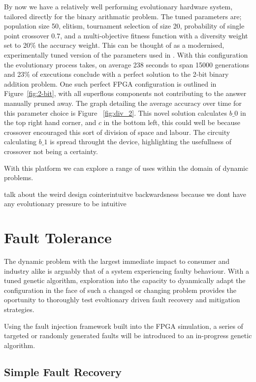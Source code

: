 By now we have a relatively well performing evolutionary hardware system,
tailored directly for the binary arithmatic problem. The tuned parameters
are; population size 50, elitism, tournament selection of size 20,
probability of single point crossover 0.7, and a multi-objective fitness function
with a diversity weight set to 20\% the accuracy weight.
This can be thought of as a modernised, experimentally tuned version of the
parameters used in \cite{10.1007/3-540-63173-9_61}.
With this configuration
the evolutionary process takes, on average 238 seconds to span 15000 generations
and 23\% of executions conclude with a perfect solution to the 2-bit binary addition
problem. One such perfect FPGA configuration is outlined in Figure~\ref{fig:2-bit},
with all superflous components not contributing to the answer manually pruned away.
The graph detailing the average accuracy over time for this parameter choice is Figure
~\ref{fig:div_2}.
This novel solution calculates $b\_0$ in the top right hand corner, and $c$ in the
bottom left, this could well be because crossover encouraged this sort of division
of space and labour. The circuity calculating $b\_1$ is spread throught the device,
highlighting the usefullness of crossover not being a certainty.

With this platform we can explore
a range of uses within the domain of dynamic problems.

\todo talk about the weird design cointerintuitve backwardsness because we
dont have any evolutionary pressure to be intuitive

\section{Fault Tolerance}

The dynamic problem with the largest immediate impact to consumer and industry
alike is arguably that of a system experiencing faulty behaviour.
With a tuned genetic algorithm, exploration into the capacity to dyanmically
adapt the configuration in the face of such a changed or changing problem provides
the oportunity to thoroughly test evoltionary driven fault recovery and mitigation
strategies.

Using the fault injection framework built into the FPGA simulation, a series
of targeted or randomly generated faults will be introduced to an in-progress
genetic algorithm.

\subsection{Simple Fault Recovery}

